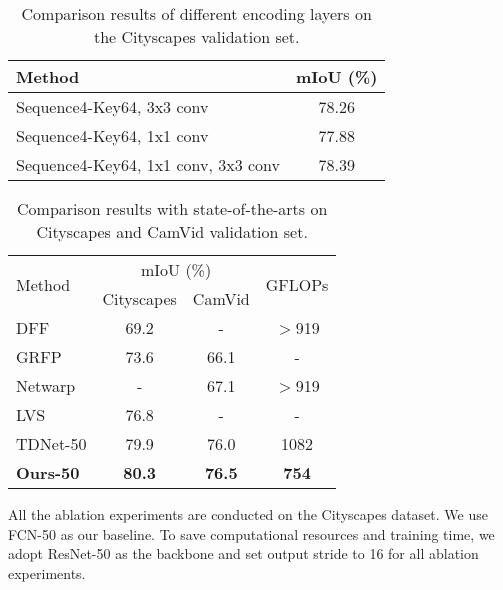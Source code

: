 \documentclass{article}
\begin{document}
	\begin{table}[t]
		\caption{Comparison results of different encoding layers on the Cityscapes validation set.}
		\vspace{-0.3cm}
		\begin{center}
			\begin{tabular}{l | c }
				\hline
				Method & mIoU (\%) \\
				\hline\hline
				Sequence4-Key64, 3x3 conv & 78.26 \\
				Sequence4-Key64, 1x1 conv & 77.88 \\
				Sequence4-Key64, 1x1 conv, 3x3 conv & 78.39 \\
				\hline
			\end{tabular}
		\end{center}
		\vspace{-0.5cm}
		\label{ablation 02}
	\end{table}
	
	
	
	\begin{table}
		\vspace{-0.3cm}
		\caption{Comparison results with state-of-the-arts on Cityscapes and CamVid validation set.}
		\vspace{-0.3cm}
		\begin{center}
\begin{tabular}{l | c | c | c}
    			\hline
    			\multirow{2}{*}{Method} & \multicolumn{2}{c|}{mIoU (\%)} & \multirow{2}{*}{GFLOPs} \\
    			& Cityscapes & CamVid & \\
    			\hline\hline
    			DFF \cite{DFF2017} & 69.2 & - & $>$919 \\
    			GRFP \cite{GRFP2018} & 73.6 & 66.1 & - \\
    			Netwarp \cite{netwarping2017} & - & 67.1 & $>$919 \\
    			LVS \cite{LVS2018} & 76.8 & - & - \\
\hline
    			TDNet-50 \cite{TDNet2019} & 79.9 & 76.0 & 1082 \\
    			\hline
    			\textbf{Ours-50} & \textbf{80.3} & \textbf{76.5} & \bf{754} \\
    			\hline
    		\end{tabular}
    	\end{center}
		\vspace{-0.7cm}
		\label{sota}
	\end{table}
	
	All the ablation experiments are conducted on the Cityscapes dataset. We use FCN-50\cite{FCN2015} as our baseline. To save computational resources and training time, we adopt ResNet-50 as the backbone and set output stride to 16 for all ablation experiments. 
\end{document}
